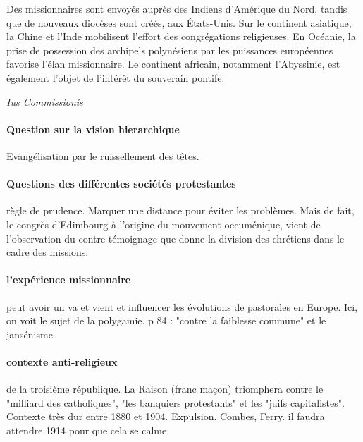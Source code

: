 Des missionnaires sont envoyés auprès des Indiens d’Amérique du Nord, tandis que de nouveaux diocèses sont créés, aux États-Unis. Sur le continent asiatique, la Chine et l’Inde mobilisent l’effort des congrégations religieuses. En Océanie, la prise de possession des archipels polynésiens par les puissances européennes favorise l’élan missionnaire. Le continent africain, notamment l’Abyssinie, est également l’objet de l’intérêt du souverain pontife.

\textit{Ius Commissionis}   

\paragraph{Question sur la vision hierarchique} Evangélisation par le ruissellement des têtes. 


\paragraph{Questions des différentes sociétés protestantes} règle de prudence. Marquer une distance pour éviter les problèmes. Mais de fait, le congrès d'Edimbourg à l'origine du mouvement oecuménique, vient de l'observation du contre témoignage que donne la division des chrétiens dans le cadre des missions.

\paragraph{l'expérience missionnaire} peut avoir un va et vient et influencer les évolutions de pastorales en Europe. Ici, on voit le sujet de la polygamie. p 84 : "contre la faiblesse commune" et le jansénisme.


\paragraph{contexte anti-religieux} de la troisième république. La Raison (franc maçon) triomphera contre le "milliard des catholiques", "les banquiers protestants" et les "juifs capitalistes". Contexte très dur entre 1880 et 1904. Expulsion. Combes, Ferry.
il faudra attendre 1914 pour que cela se calme.



